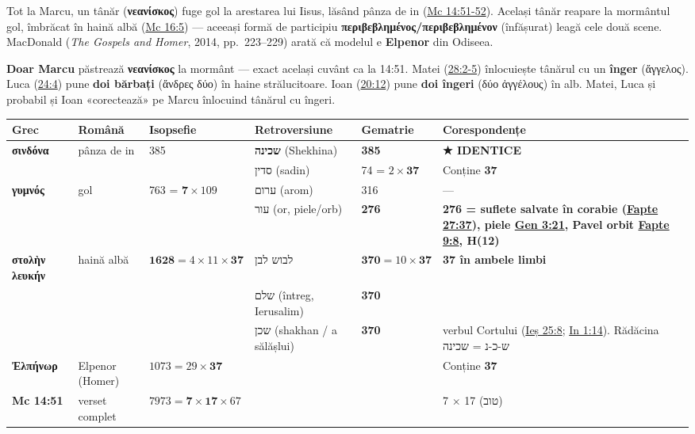 \documentclass[12pt,a4paper,twoside,openany]{book}
\begin{document}
Tot la Marcu, un tânăr (\textbf{νεανίσκος}) fuge gol la arestarea lui Iisus, lăsând pânza de in (\href{https://bibliaortodoxa.ro/carte.php?id=53\&cap=14\#51}{Mc 14:51-52}). Același tânăr reapare la mormântul gol, îmbrăcat în haină albă (\href{https://bibliaortodoxa.ro/carte.php?id=53\&cap=16\#5}{Mc 16:5}) --- aceeași formă de participiu \textbf{περιβεβλημένος/περιβεβλημένον} (înfășurat) leagă cele două scene. MacDonald (\textit{The Gospels and Homer}, 2014, pp.\ 223--229) arată că modelul e \textbf{Elpenor} din Odiseea.

\textbf{Doar Marcu} păstrează \textbf{νεανίσκος} la mormânt --- exact același cuvânt ca la 14:51. Matei (\href{https://bibliaortodoxa.ro/carte.php?id=55\&cap=28\#2}{28:2-5}) înlocuiește tânărul cu un \textbf{înger} (ἄγγελος). Luca (\href{https://bibliaortodoxa.ro/carte.php?id=48\&cap=24\#4}{24:4}) pune \textbf{doi bărbați} (ἄνδρες δύο) în haine strălucitoare. Ioan (\href{https://bibliaortodoxa.ro/carte.php?id=35\&cap=20\#12}{20:12}) pune \textbf{doi îngeri} (δύο ἀγγέλους) în alb. Matei, Luca și probabil și Ioan «corectează» pe Marcu înlocuind tânărul cu îngeri.

\begin{center}
\footnotesize
\begin{tabular}{L{2cm}L{2cm}C{2.2cm}L{2.5cm}C{1.8cm}L{2.5cm}}
\toprule
{}
\textbf{Grec} & \textbf{Română} & \textbf{Isopsefie} & \textbf{Retroversiune} & \textbf{Gematrie} & \textbf{Corespondențe} \\
\midrule
\textbf{σινδόνα} & pânza de in & 385 & \textbf{שכינה} (Shekhina) & \textbf{385} & \textbf{\textcolor{primary}{★ IDENTICE}} \\
 & & & סדין (sadin) & 74 = $2 \times \mathbf{37}$ & Conține \textbf{37} \\
\textbf{γυμνός} & gol & 763 = $\mathbf{7} \times 109$ & ערום (arom) & 316 & — \\
 & & & עור (or, piele/orb) & \textbf{276} & \textbf{\textcolor{primary}{276 = suflete salvate în corabie (\href{https://bibliaortodoxa.ro/carte.php?id=26\&cap=27\#37}{Fapte 27:37}), piele \href{https://bibliaortodoxa.ro/carte.php?id=25\&cap=3\#21}{Gen 3:21}, Pavel orbit \href{https://bibliaortodoxa.ro/carte.php?id=26\&cap=9\#8}{Fapte 9:8}, H(12)}} \\
\textbf{στολὴν λευκήν} & haină albă & $\mathbf{1628} = 4 \times 11 \times \mathbf{37}$ & לבוש לבן & $\mathbf{370} = 10 \times \mathbf{37}$ & \textbf{37 în ambele limbi} \\
 & & & שלם (întreg, Ierusalim) & \textbf{370} & \\
 & & & שכן (shakhan / a sălășlui) & \textbf{370} & verbul Cortului (\href{https://bibliaortodoxa.ro/carte.php?id=32\&cap=25\#8}{Ieș 25:8}; \href{https://bibliaortodoxa.ro/carte.php?id=35\&cap=1\#14}{In 1:14}). Rădăcina ש-כ-נ = שכינה \\
\textbf{Ἐλπήνωρ} & Elpenor (Homer) & $1073 = 29 \times \mathbf{37}$ & & & Conține \textbf{37} \\
\textbf{Mc 14:51} & verset complet & $7973 = \mathbf{7} \times \mathbf{17} \times 67$ & & & 7 $\times$ 17 (טוב) \\
\bottomrule
\end{tabular}
\end{center}
\normalsize
\end{document}
